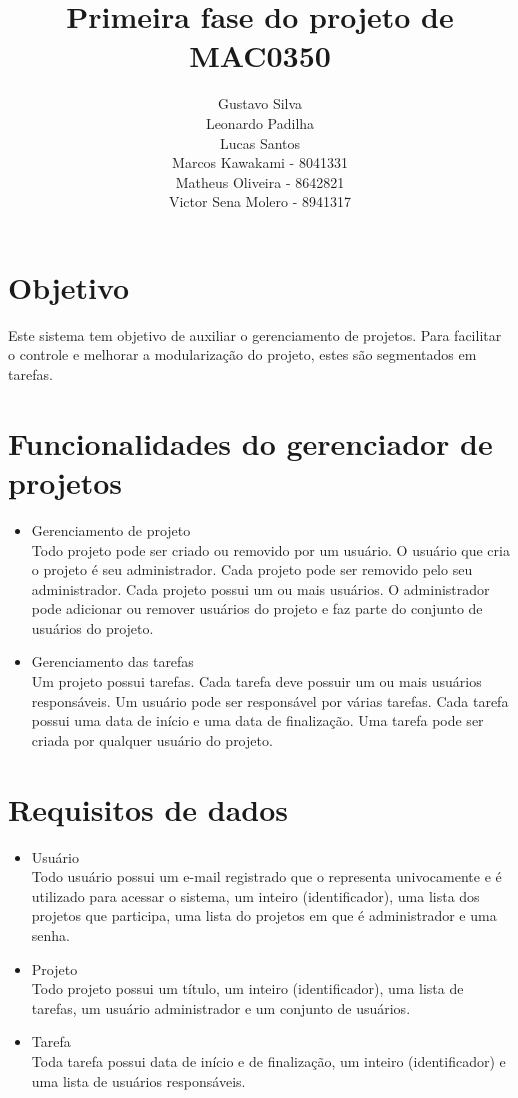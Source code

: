 \documentclass{article}
\title{Primeira fase do projeto de MAC0350}
\author{Gustavo Silva \\Leonardo Padilha \\Lucas Santos \\Marcos Kawakami - 8041331 \\Matheus Oliveira - 8642821 \\Victor Sena Molero - 8941317}
\date{}
\begin{document}
\maketitle

\section{Objetivo}
Este sistema tem objetivo de auxiliar o gerenciamento de projetos. Para facilitar o controle e melhorar a modularização do projeto, estes são segmentados em tarefas.

\section{Funcionalidades do gerenciador de projetos}
\begin{itemize}
    \item Gerenciamento de projeto
    \\Todo projeto pode ser criado ou removido por um usuário. O usuário que cria o projeto é seu administrador. Cada projeto pode ser removido pelo seu administrador. Cada projeto possui um ou mais usuários. O administrador pode adicionar ou remover usuários do projeto e faz parte do conjunto de usuários do projeto.
    \item Gerenciamento das tarefas
    \\Um projeto possui tarefas. Cada tarefa deve possuir um ou mais usuários responsáveis. Um usuário pode ser responsável por várias tarefas. Cada tarefa possui uma data de início e uma data de finalização. Uma tarefa pode ser criada por qualquer usuário do projeto.
\end{itemize}

\section{Requisitos de dados}
\begin{itemize}
    \item Usuário
    \\ Todo usuário possui um e-mail registrado que o representa univocamente e é utilizado para acessar o sistema, um inteiro (identificador), uma lista dos projetos que participa, uma lista do projetos em que é administrador e uma senha.
    \item Projeto
    \\Todo projeto possui um título, um inteiro (identificador), uma lista de tarefas, um usuário administrador e um conjunto de usuários.
    \item Tarefa
    \\Toda tarefa possui data de início e de finalização, um inteiro (identificador) e uma lista de usuários responsáveis.
\end{itemize}
\end{document}
